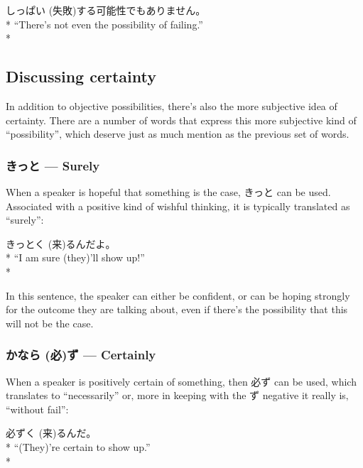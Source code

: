 \documentclass[11pt, b5paper, twoside, openright, onecolumn]{book}
\makeatletter
\newcommand*{\rubystack}[2]{{\relscale{0.5}%
  \begin{tabular}[b]{@{}c@{}}%
    {#1}\\%
   {\textscale{2}{#2}}%
  \end{tabular}}%
}
\DeclareRobustCommand*{\ruby}[2]{%
  \mbox{%
    \setlength{\parskip}{0ex}%
    \BeginAccSupp{method=pdfstringdef,ActualText={#1}}%
      \rubystack{\phantom{#2}}{#1}%
      \llap{%
        \rubystack{#2}{\phantom{#1}}%
      }%
    \EndAccSupp{}%
  }%
}
\renewcommand*{\ruby}[2]{#2 (#1)}%
\newenvironment{exampleblock}{
\setlength{\parindent}{0.6in}
\begin{minipage}[t]{\dimexpr\textwidth-\parindent}}
{\end{minipage}}
\makeatother
\begin{document}
\vspace{0.4cm}
\begin{exampleblock}
\ruby{失敗}{しっぱい}する可能性でもありません。 \\* 
“There’s not even the possibility of failing.” \\* 
\end{exampleblock}
\subsection{Discussing certainty}


In addition to objective possibilities‚ there’s also the more subjective idea of certainty. There are a number of words that express this more subjective kind of “possibility”‚ which deserve just as much mention as the previous set of words.

\subsubsection{きっと — Surely}

When a speaker is hopeful that something is the case‚ きっと can be used. Associated with a positive kind of wishful thinking‚ it is typically translated as “surely”:

\vspace{0.4cm}
\begin{exampleblock}
きっと\ruby{来}{く}るんだよ。 \\* 
“I am sure (they)’ll show up!” \\* 
\end{exampleblock}
\vspace{0.2cm}

In this sentence‚ the speaker can either be confident‚ or can be hoping strongly for the outcome they are talking about‚ even if there’s the possibility that this will not be the case.

\subsubsection{\ruby{必}{かなら}ず — Certainly}

When a speaker is positively certain of something‚ then 必ず can be used‚ which translates to “necessarily” or‚ more in keeping with the ず negative it really is‚ “without fail”:

\vspace{0.4cm}
\begin{exampleblock}
必ず\ruby{来}{く}るんだ。 \\* 
“(They)’re certain to show up.” \\* 
\end{exampleblock}
\vspace{0.2cm}
\end{document}
